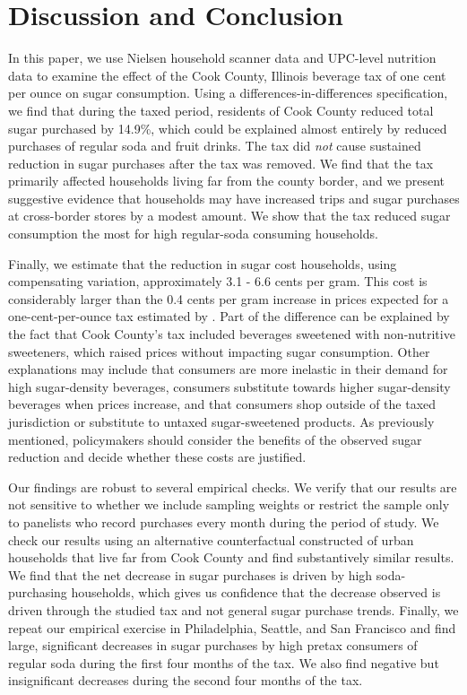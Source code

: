 \documentclass[12pt]{article}
\begin{document}

\section{Discussion and Conclusion} \label{discussion}

In this paper, we use Nielsen household scanner data and UPC-level nutrition data to examine the effect of the Cook County, Illinois beverage tax of one cent per ounce on sugar consumption. Using a differences-in-differences specification, we find that during the taxed period, residents of Cook County reduced total sugar purchased by 14.9\%, which could be explained almost entirely by reduced purchases of regular soda and fruit drinks. The tax did \textit{not} cause sustained reduction in sugar purchases after the tax was removed. We find that the tax primarily affected households living far from the county border, and we present suggestive evidence that households may have increased trips and sugar purchases at cross-border stores by a modest amount. We show that the tax reduced sugar consumption the most for high regular-soda consuming households.

Finally, we estimate that the reduction in sugar cost households, using compensating variation, approximately 3.1 - 6.6 cents per gram. This cost is considerably larger than the 0.4 cents per gram
increase in prices expected for a one-cent-per-ounce tax estimated by \textcite{grummon2019designing}. Part of the difference can be explained by the fact that Cook County's tax included beverages sweetened with non-nutritive sweeteners, which raised prices without impacting sugar consumption. Other explanations may include that consumers are more inelastic in their demand for high sugar-density beverages, consumers substitute towards higher sugar-density beverages when prices increase, and that consumers shop outside of the taxed jurisdiction or substitute to untaxed sugar-sweetened products. As previously mentioned, policymakers should consider the benefits of the observed sugar reduction and decide whether these costs are justified.

Our findings are robust to several empirical checks. We verify that our results are not sensitive to whether we include sampling weights or restrict the sample only to panelists who record purchases every month during the period of study. We check our results using an alternative counterfactual constructed of urban households that live far from Cook County and find substantively similar results. We find that the net decrease in sugar purchases is driven by high soda-purchasing households, which gives us confidence that the decrease observed is driven through the studied tax and not general sugar purchase trends. Finally, we repeat our empirical exercise in Philadelphia, Seattle, and San Francisco and find large, significant decreases in sugar purchases by high pretax consumers of regular soda during the first four months of the tax. We also find negative but insignificant decreases during the second four months of the tax.
\end{document}
